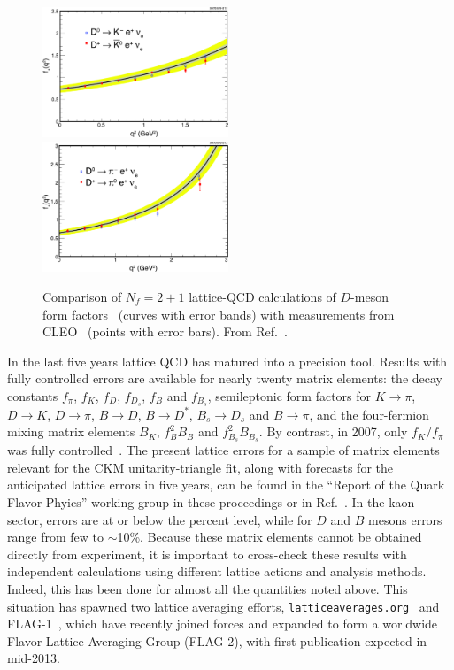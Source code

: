\begin{figure}
    \centering
    \includegraphics[width=0.495\textwidth]{CpF-T3/D2K.pdf}\hfill
    \includegraphics[width=0.495\textwidth]{CpF-T3/D2pi.pdf}
    \caption[Lattice-QCD calculations of $D$-meson form factors compared with measurements]{Comparison of 
        $N_f = 2+1$ lattice-QCD calculations of $D$-meson form factors~\cite{Aubin:2004ej,Bernard:2009ke} 
        (curves with error bands) with measurements from CLEO~\cite{Besson:2009uv} (points with error bars).
        From Ref.~\cite{Besson:2009uv}.}
    \label{lqcd:fig:D2K}
\end{figure}

In the last five years lattice QCD has matured into a precision tool.  Results
with fully controlled errors are available for nearly twenty matrix elements:
the decay constants $f_\pi$, $f_K$, $f_D$, $f_{D_s}$, $f_B$ and $f_{B_s}$,
semileptonic form factors for $K\to \pi$, $D \to K$, $D\to\pi$, $B\to D$,
$B\to D^{*}$, $B_s\to D_s$ and $B\to\pi$, and the four-fermion mixing matrix
elements $B_K$, $f_B^2 B_B$ and $f_{B_s}^2 B_{B_s}$.  By contrast, in 2007,
only $f_K/f_\pi$ was fully controlled~\cite{whitepaper07}.  The present
lattice errors for a sample of matrix elements relevant for the CKM
unitarity-triangle fit, along with forecasts for the anticipated lattice
errors in five years, can be found in the ``Report of the Quark Flavor Phyics''
working group in these proceedings or in Ref.~\cite{USQCD_IF_whitepaper13}.
In the kaon sector, errors are at or below the percent level, while for $D$
and $B$ mesons errors range from few to $\sim$10\%.  Because these matrix
elements cannot be obtained directly from experiment, it is important to
cross-check these results with independent calculations using different
lattice actions and analysis methods.  Indeed, this has been done for almost
all the quantities noted above.  This situation has spawned two lattice
averaging efforts, {\tt latticeaverages.org}~\cite{Laiho:2009eu} and
FLAG-1~\cite{Colangelo:2010et}, which have recently joined forces and expanded
to form a worldwide Flavor Lattice Averaging Group (FLAG-2), with first
publication expected in mid-2013.

